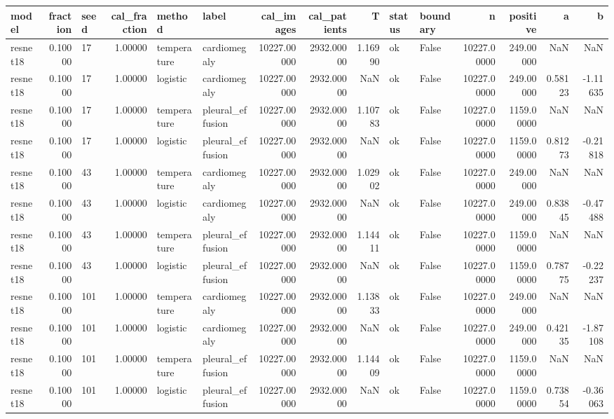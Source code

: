 \begin{tabular}{lrlrllrrrllrrrr}
\toprule
model & fraction & seed & cal\_fraction & method & label & cal\_images & cal\_patients & T & status & boundary & n & positive & a & b \\
\midrule
resnet18 & 0.10000 & 17 & 1.00000 & temperature & cardiomegaly & 10227.00000 & 2932.00000 & 1.16990 & ok & False & 10227.00000 & 249.00000 & NaN & NaN \\
resnet18 & 0.10000 & 17 & 1.00000 & logistic & cardiomegaly & 10227.00000 & 2932.00000 & NaN & ok & False & 10227.00000 & 249.00000 & 0.58123 & -1.11635 \\
resnet18 & 0.10000 & 17 & 1.00000 & temperature & pleural\_effusion & 10227.00000 & 2932.00000 & 1.10783 & ok & False & 10227.00000 & 1159.00000 & NaN & NaN \\
resnet18 & 0.10000 & 17 & 1.00000 & logistic & pleural\_effusion & 10227.00000 & 2932.00000 & NaN & ok & False & 10227.00000 & 1159.00000 & 0.81273 & -0.21818 \\
resnet18 & 0.10000 & 43 & 1.00000 & temperature & cardiomegaly & 10227.00000 & 2932.00000 & 1.02902 & ok & False & 10227.00000 & 249.00000 & NaN & NaN \\
resnet18 & 0.10000 & 43 & 1.00000 & logistic & cardiomegaly & 10227.00000 & 2932.00000 & NaN & ok & False & 10227.00000 & 249.00000 & 0.83845 & -0.47488 \\
resnet18 & 0.10000 & 43 & 1.00000 & temperature & pleural\_effusion & 10227.00000 & 2932.00000 & 1.14411 & ok & False & 10227.00000 & 1159.00000 & NaN & NaN \\
resnet18 & 0.10000 & 43 & 1.00000 & logistic & pleural\_effusion & 10227.00000 & 2932.00000 & NaN & ok & False & 10227.00000 & 1159.00000 & 0.78775 & -0.22237 \\
resnet18 & 0.10000 & 101 & 1.00000 & temperature & cardiomegaly & 10227.00000 & 2932.00000 & 1.13833 & ok & False & 10227.00000 & 249.00000 & NaN & NaN \\
resnet18 & 0.10000 & 101 & 1.00000 & logistic & cardiomegaly & 10227.00000 & 2932.00000 & NaN & ok & False & 10227.00000 & 249.00000 & 0.42135 & -1.87108 \\
resnet18 & 0.10000 & 101 & 1.00000 & temperature & pleural\_effusion & 10227.00000 & 2932.00000 & 1.14409 & ok & False & 10227.00000 & 1159.00000 & NaN & NaN \\
resnet18 & 0.10000 & 101 & 1.00000 & logistic & pleural\_effusion & 10227.00000 & 2932.00000 & NaN & ok & False & 10227.00000 & 1159.00000 & 0.73854 & -0.36063 \\

\end{tabular}
